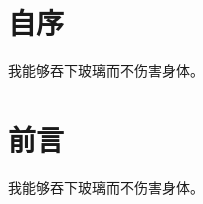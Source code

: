 %
%
%
%

\chapter{自序}
\label{ch:prologue}
我能够吞下玻璃而不伤害身体。

\chapter{前言}
\label{ch:preface}
我能够吞下玻璃而不伤害身体。

